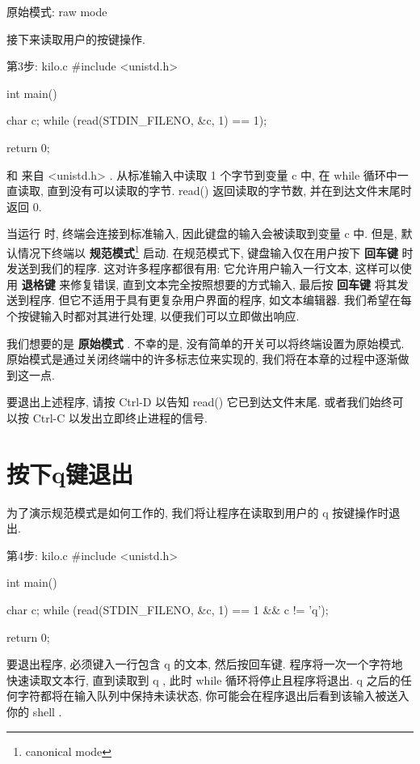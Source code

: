 \documentclass[lang=cn,newtx,10pt,scheme=chinese]{elegantbook}
\begin{document}
\begin{marker}
原始模式: raw mode
\end{marker}

接下来读取用户的按键操作.

\begin{mycode}{第3步: kilo.c}
#include <unistd.h>

int main() {
  char c;
  while (read(STDIN_FILENO, &c, 1) == 1);

  return 0;
}
\end{mycode}

 和  来自 <unistd.h> .  从标准输入中读取 1 个字节到变量 c 中, 在 while 循环中一直读取, 直到没有可以读取的字节. read() 返回读取的字节数, 并在到达文件末尾时返回 0.

当运行  时, 终端会连接到标准输入, 因此键盘的输入会被读取到变量 c 中. 但是, 默认情况下终端以 \textbf{规范模式}\footnote{canonical mode} 启动. 在规范模式下, 键盘输入仅在用户按下 \textbf{回车键} 时发送到我们的程序. 这对许多程序都很有用: 它允许用户输入一行文本, 这样可以使用 \textbf{退格键} 来修复错误, 直到文本完全按照想要的方式输入, 最后按 \textbf{回车键} 将其发送到程序. 但它不适用于具有更复杂用户界面的程序, 如文本编辑器. 我们希望在每个按键输入时都对其进行处理, 以便我们可以立即做出响应.

我们想要的是 \textbf{原始模式} . 不幸的是, 没有简单的开关可以将终端设置为原始模式. 原始模式是通过关闭终端中的许多标志位来实现的, 我们将在本章的过程中逐渐做到这一点.

要退出上述程序, 请按 Ctrl-D 以告知 read() 它已到达文件末尾. 或者我们始终可以按 Ctrl-C 以发出立即终止进程的信号.

\section{按下q键退出}

为了演示规范模式是如何工作的, 我们将让程序在读取到用户的 q 按键操作时退出.

\begin{mycode}{第4步: kilo.c}
#include <unistd.h>

int main() {
  char c;
  while (read(STDIN_FILENO, &c, 1) == 1 && c != 'q');

  return 0;
}
\end{mycode}

要退出程序, 必须键入一行包含 q 的文本, 然后按回车键. 程序将一次一个字符地快速读取文本行, 直到读取到 q , 此时 while 循环将停止且程序将退出. q 之后的任何字符都将在输入队列中保持未读状态, 你可能会在程序退出后看到该输入被送入你的 shell .
\end{document}
